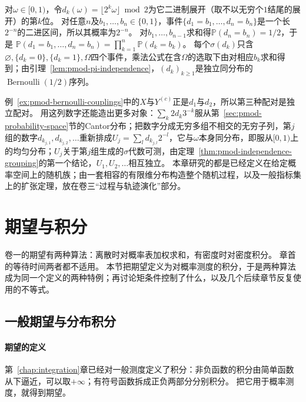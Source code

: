 \begin{example}[二进制数字是独立的公平比特]
\label{ex:pmod-binary-digits}
对$\omega\in[0,1)$，令$d_k(\omega)=\lfloor2^k\omega\rfloor\bmod2$为它二进制展开（取不以无穷个$1$结尾的展开）的第$k$位。
对任意$n$及$b_1,\dots,b_n\in\{0,1\}$，事件$\{d_1=b_1,\dots,d_n=b_n\}$是一个长$2^{-n}$的二进区间，所以其概率为$2^{-n}$。
对$b_1,\dots,b_{n-1}$求和得$\mathbb P(d_n=b_n)=1/2$，于是
$\mathbb P(d_1=b_1,\dots,d_n=b_n)=\prod_{k=1}^n\mathbb P(d_k=b_k)$。
每个$\sigma(d_k)$只含$\varnothing,\{d_k=0\},\{d_k=1\},\Omega$四个事件，乘法公式在含$\Omega$的选取下由对相应$b_k$求和得到；由引理~\ref{lem:pmod-pi-independence}，$(d_k)_{k\ge1}$是独立同分布的$\operatorname{Bernoulli}(1/2)$序列。
\end{example}

例~\ref{ex:pmod-bernoulli-couplings}中的$X$与$Y^{(c)}$正是$d_1$与$d_2$，所以第三种配对是独立配对。
用这列数字还能造出更多对象：$\sum_k2d_k3^{-k}$服从第~\ref{sec:pmod-probability-space}节的Cantor分布；把数字分成无穷多组不相交的无穷子列，第$j$组的数字$d_{k_{j,1}},d_{k_{j,2}},\dots$重新排成$U_j=\sum_l d_{k_{j,l}}2^{-l}$，它与$\omega$本身同分布，即服从$[0,1)$上的均匀分布；$U_j$关于第$j$组生成的$\sigma$代数可测，由定理~\ref{thm:pmod-independence-grouping}的第一个结论，$U_1,U_2,\dots$相互独立。
本章研究的都是已经定义在给定概率空间上的随机族；由一套相容的有限维分布构造整个随机过程，以及一般指标集上的扩张定理，放在卷三“过程与轨迹演化”部分。

\section{期望与积分}
\label{sec:pmod-expectation}

卷一的期望有两种算法：离散时对概率表加权求和，有密度时对密度积分。
章首的等待时间两者都不适用。
本节把期望定义为对概率测度的积分，于是两种算法成为同一个定义的两种特例；再讨论矩条件控制了什么，以及几个后续章节反复使用的不等式。

\subsection{一般期望与分布积分}

\paragraph{期望的定义}
第~\ref{chap:integration}章已经对一般测度定义了积分：非负函数的积分由简单函数从下逼近，可以取$+\infty$；有符号函数拆成正负两部分分别积分。
把它用于概率测度，就得到期望。

